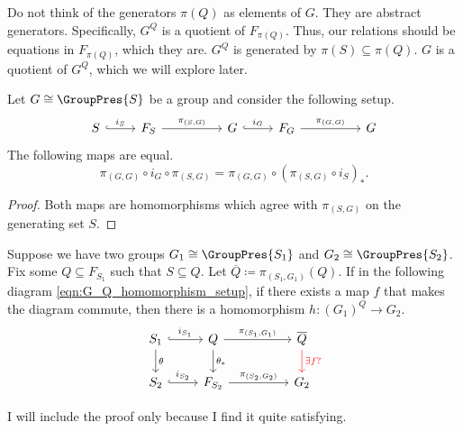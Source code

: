Do not think of  the generators $\pi(Q)$ as elements of $G$.
They are abstract generators.
Specifically,  $G^Q$ is a quotient of  $F_{\pi(Q)}$.
Thus, our relations should be equations in $F_{\pi(Q)}$, which they are.
$G^Q$ is generated by $\pi(S) \subseteq \pi(Q)$.
$G$ is a quotient of  $G^Q$, which we will explore later.

\begin{lemma}
	Let $G \cong \GroupPres{S}$ be a group and consider the following setup.
	\[
		\begin{tikzcd}
			S \ar[r, hook, "i_S"] & F_S \ar[rr, "\pi_{(S,G)}"] & & G \ar[r, hook, "i_G"] & F_G \ar[rr, "\pi_{(G,G)}"] & & G
		\end{tikzcd}
	\]
	The following maps are equal.
	\[
		\pi_{(G,G)} \circ i_G \circ \pi_{(S,G)} = \pi_{(G,G)} \circ (\pi_{(S,G)} \circ i_S)_*
		.\]
	\label{lem:group_projections}
\end{lemma}

\begin{proof}
	Both maps are homomorphisms which agree with $\pi_{\left( S,G\right)}$ on the generating set $S$.
\end{proof}

\begin{proposition}
	Suppose we have two groups $G_1 \cong \GroupPres{S_1}$ and $G_2 \cong \GroupPres{S_2}$.
	Fix some $Q \subseteq F_{S_1}$ such that  $S \subseteq Q$.
	Let $\overline{Q} \coloneqq \pi_{(S_1, G_1)}(Q) $.
	If in the following diagram \eqref{eqn:G_Q_homomorphism_setup}, if there exists a map $f$ that makes the diagram commute, then there is a homomorphism $h \colon (G_1)^Q \to G_2$.
	\begin{equation}
		\begin{tikzcd}
			S_1 \ar[d, "\theta"] \ar[r, hook, "i_{S_1}"] & Q \ar[d, "\theta_*"] \ar[rr, "\pi_{(S_1,G_1)}"] & & \overline{Q} \ar[d, color=red, "\exists f ?"] \\
			S_2 \ar[r, hook, "i_{S_2}"] & F_{S_2} \ar[rr, "\pi_{(S_2,G_2)}"] & & G_2
		\end{tikzcd}
		\label{eqn:G_Q_homomorphism_setup}
	\end{equation}
	\label{thm:G_Q_homomorphism}
\end{proposition}

I will include the proof only because I find it quite satisfying.

